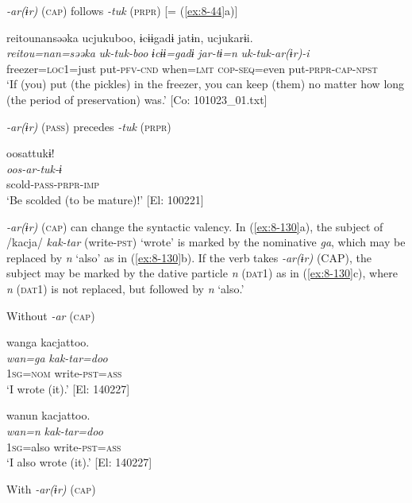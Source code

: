 \ea\label{ex:8-129}
\ea \textit{-ar(ɨr)} (\textsc{cap}) follows \textit{-tuk} (\textsc{prpr}) [= (\ref{ex:8-44}a)]

  {\TM}
\glll  {\textbar}reitou{\textbar}nansəəka  ucjukuboo,  ɨcɨɨgadɨ  jatɨn,    ucjukarɨi.\\
\textit{reitou=nan=səəka}  \textit{uk-tuk-boo}  \textit{ɨcɨɨ=gadɨ}  \textit{jar-tɨ=n}    \textit{uk-tuk-ar(ɨr)-i}\\
    freezer=\textsc{loc1}=just  put-\textsc{pfv}-\textsc{cnd}  when=\textsc{lmt}  \textsc{cop}-\textsc{seq}=even put-\textsc{prpr}-\textsc{cap}-\textsc{npst}\\
\glt ‘If (you) put (the pickles) in the freezer, you can keep (them) no matter how long (the period of preservation) was.’ [Co: 101023\_01.txt]


\ex \textit{-ar(ɨr)} (\textsc{pass}) precedes \textit{-tuk} (\textsc{prpr})

  {\TM}
\glll  oosattukɨ!\\
\textit{oos-ar-tuk-ɨ}\\
  scold-\textsc{pass}-\textsc{prpr}-\textsc{imp}\\
\glt ‘Be scolded (to be mature)!’ [El: 100221]
\z
\z

  \textit{-ar(ɨr)} (\textsc{cap}) can change the syntactic valency. In (\ref{ex:8-130}a), the subject of /kacja/ \textit{kak-tar} (write-\textsc{pst}) ‘wrote’ is marked by the nominative \textit{ga}, which may be replaced by \textit{n} ‘also’ as in (\ref{ex:8-130}b). If the verb takes \textit{-ar(ɨr)} (CAP), the subject may be marked by the dative particle \textit{n} (\textsc{dat1}) as in (\ref{ex:8-130}c), where \textit{n} (\textsc{dat1}) is not replaced, but followed by \textit{n} ‘also.’

\ea\label{ex:8-130}
  Without \textit{-ar} (\textsc{cap})

\ea
{\TM}
\glll  wanga  kacjattoo.\\
\textit{wan=ga}  \textit{kak-tar=doo}\\
1\textsc{sg}=\textsc{nom}  write-\textsc{pst}=\textsc{ass}\\
\glt ‘I wrote (it).’ [El: 140227]

\ex
{\TM}
\glll  wanun  kacjattoo.\\
\textit{wan=n}  \textit{kak-tar=doo}\\
1\textsc{sg}=also  write-\textsc{pst}=\textsc{ass}\\
\glt ‘I also wrote (it).’ [El: 140227]

  With \textit{-ar(ɨr)} (\textsc{cap})

